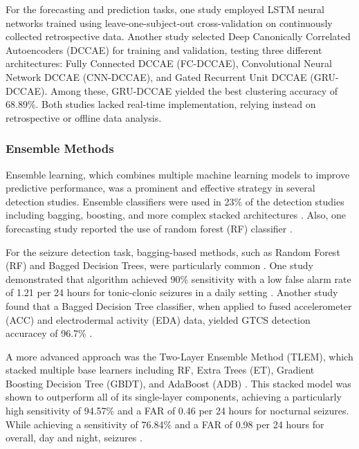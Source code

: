 For the forecasting and prediction tasks, one study \cite{Meisel2020-ii} employed LSTM neural networks trained using leave-one-subject-out cross-validation on continuously collected retrospective data. Another study \cite{Vieluf2023-ta} selected Deep Canonically Correlated Autoencoders (DCCAE) for training and validation, testing three different architectures: Fully Connected DCCAE (FC-DCCAE), Convolutional Neural Network DCCAE (CNN-DCCAE), and Gated Recurrent Unit DCCAE (GRU-DCCAE). Among these, GRU-DCCAE yielded the best clustering accuracy of 68.89\%. Both studies lacked real-time implementation, relying instead on retrospective or offline data analysis.


\subsubsection{Ensemble Methods}
Ensemble learning, which combines multiple machine learning models to improve predictive performance, was a prominent and effective strategy in several detection studies. Ensemble classifiers were used in 23\% of the detection studies  including bagging, boosting, and more complex stacked architectures \cite{Wang2022-lt, Chowdhury2022-bi, Vakilna2024-hk, Dong2022-oo, Jiang2022-zu, Wu2024-yl}. Also, one forecasting study reported the use of random forest (RF) classifier \cite{Vieluf2023-zv}.

For the seizure detection task, bagging-based methods, such as Random Forest (RF) and Bagged Decision Trees, were particularly common \cite{Chowdhury2022-bi, Wang2022-lt, Wu2024-yl, Vakilna2024-hk}. One study demonstrated that  algorithm achieved 90\% sensitivity with a low false alarm rate of 1.21 per 24 hours for tonic-clonic seizures in a daily setting \cite{Wang2022-lt}. Another study found that a Bagged Decision Tree classifier, when applied to fused accelerometer (ACC) and electrodermal activity (EDA) data, yielded GTCS detection accuracey of 96.7\% \cite{Chowdhury2022-bi}.

A more advanced approach was the Two-Layer Ensemble Method (TLEM), which stacked multiple base learners including RF, Extra Trees (ET), Gradient Boosting Decision Tree (GBDT), and AdaBoost (ADB) \cite{Dong2022-oo}. This stacked model was shown to outperform all of its single-layer components, achieving a particularly high sensitivity of 94.57\% and a FAR of 0.46 per 24 hours for nocturnal seizures. While achieving a sensitivity of 76.84\% and a FAR of 0.98 per 24 hours for overall, day and night, seizures \cite{Dong2022-oo}.

